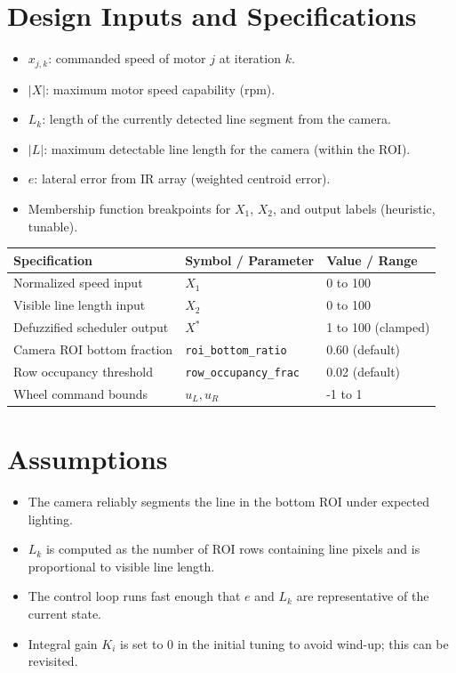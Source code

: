 \documentclass{article}
\begin{document}
\section{Design Inputs and Specifications}
\begin{itemize}
\item $x_{j,k}$: commanded speed of motor $j$ at iteration $k$.
\item $|X|$: maximum motor speed capability (rpm).
\item $L_k$: length of the currently detected line segment from the camera.
\item $|L|$: maximum detectable line length for the camera (within the ROI).
\item $e$: lateral error from IR array (weighted centroid error).
\item Membership function breakpoints for $X_1$, $X_2$, and output labels (heuristic, tunable).
\end{itemize}

\begin{center}
\begin{tabular}{lll}
\toprule
Specification & Symbol / Parameter & Value / Range \\
\midrule
Normalized speed input & $X_1$ & 0 to 100 \\
Visible line length input & $X_2$ & 0 to 100 \\
Defuzzified scheduler output & $X^*$ & 1 to 100 (clamped) \\
Camera ROI bottom fraction & \texttt{roi\_bottom\_ratio} & 0.60 (default) \\
Row occupancy threshold & \texttt{row\_occupancy\_frac} & 0.02 (default) \\
Wheel command bounds & $u_L, u_R$ & -1 to 1 \\
\bottomrule
\end{tabular}
\end{center}

\section{Assumptions}
\begin{itemize}
\item The camera reliably segments the line in the bottom ROI under expected lighting.
\item $L_k$ is computed as the number of ROI rows containing line pixels and is proportional to visible line length.
\item The control loop runs fast enough that $e$ and $L_k$ are representative of the current state.
\item Integral gain $K_i$ is set to 0 in the initial tuning to avoid wind-up; this can be revisited.
\end{itemize}
\end{document}
